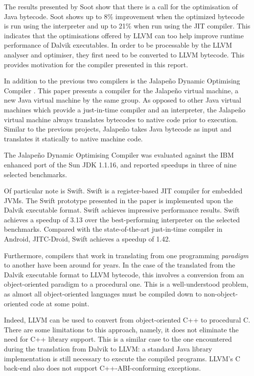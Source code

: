 The results presented by Soot show that there is a call for the optimisation of Java bytecode. Soot shows up to 8\% improvement when the optimized bytecode is run using the interpreter and up to 21\% when run using the JIT compiler. This indicates that the optimisations offered by LLVM can too help improve runtime performance of Dalvik executables. In order to be processable by the LLVM analyser and optimiser, they first need to be converted to LLVM bytecode. This provides motivation for the compiler presented in this report.


In addition to the previous two compilers is the Jalape\~{n}o Dynamic Optimising Compiler \cite{Burke:1999:JDO:304065.304113}. This paper presents a compiler for the Jalape\~{n}o virtual machine, a new Java virtual machine by the same group. As opposed to other Java virtual machines which provide a just-in-time compiler and an interpreter, the Jalape\~{n}o virtual machine always translates bytecodes to native code prior to execution. Similar to the previous projects, Jalape\~{n}o takes Java bytecode as input and translates it statically to native machine code.

The Jalape\~{n}o Dynamic Optimising Compiler was evaluated against the IBM enhanced port of the Sun JDK 1.1.16, and reported speedups in three of nine selected benchmarks.


Of particular note is Swift\cite{Zhang:2012:SRJ:2151024.2151035}. Swift is a register-based JIT compiler for embedded JVMs. The Swift prototype presented in the paper is implemented upon the Dalvik executable format. Swift achieves impressive performance results. Swift achieves a speedup of 3.13 over the best-performing interpreter on the selected benchmarks. Compared with the state-of-the-art just-in-time compiler in Android, JITC-Droid, Swift achieves a speedup of 1.42.

Furthermore, compilers that work in translating from one programming \emph{paradigm} to another have been around for years. In the case of the translated from the Dalvik executable format to LLVM bytecode, this involves a conversion from an object-oriented paradigm to a procedural one. This is a well-understood problem, as almost all object-oriented languages must be compiled down to non-object-oriented code at some point.

Indeed, LLVM can be used to convert from object-oriented C++ to procedural C\footnotemark {}. There are some limitations to this approach, namely, it does not eliminate the need for C++ library support. This is a similar case to the one encountered during the translation from Dalvik to LLVM: a standard Java library implementation is still necessary to execute the compiled programs. LLVM's C back-end also does not support C++-ABI-conforming exceptions.

